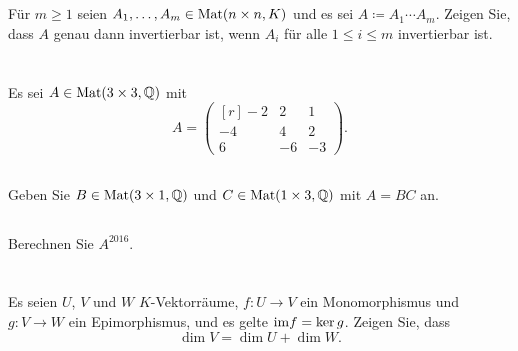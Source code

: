 \documentclass[a4paper,9pt]{extarticle}
\title{}
\author{Jendrik Stelzner}
\date{}
\begin{document}





\section{}
Für $m \geq 1$ seien $A_1, \dotsc, A_m \in \mathrm{Mat}(n \times n, K)$ und es sei $A \coloneqq A_1 \dotsm A_m$. Zeigen Sie, dass $A$ genau dann invertierbar ist, wenn $A_i$ für alle $1 \leq i \leq m$ invertierbar ist.





\section{}
Es sei $A \in \mathrm{Mat}(3 \times 3, \mathbb{Q})$ mit
\[
 A =
 \begin{pmatrix*}[r]
  -2 &  2 &  1 \\
  -4 &  4 &  2 \\
   6 & -6 & -3
 \end{pmatrix*}.
\]

\subsection{}
Geben Sie $B \in \mathrm{Mat}(3 \times 1, \mathbb{Q})$ und $C \in \mathrm{Mat}(1 \times 3, \mathbb{Q})$ mit $A = B C$ an.

\subsection{}
Berechnen Sie $A^{2016}$.





\section{}
Es seien $U$, $V$ und $W$ $K$-Vektorräume, $f \colon U \to V$ ein Monomorphismus und $g \colon V \to W$ ein Epimorphismus, und es gelte $\mathrm{im} f = \ker g$. Zeigen Sie, dass
\[
 \dim V = \dim U + \dim W.
\]
\end{document}
